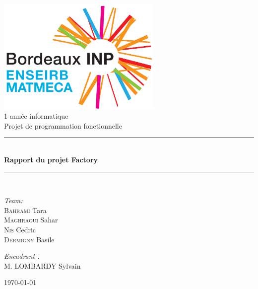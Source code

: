 \begin{titlepage}
\begin{center}
\includegraphics[width=0.6\textwidth]{logo.png}\\[1cm]
{\large 1 année informatique}\\[1cm]
{\large Projet de programmation fonctionnelle}\\[1cm]
\rule{\linewidth}{0.5mm} \\[0.4cm]
{ \huge \bfseries Rapport du projet Factory  \\[0.4cm] }
\rule{\linewidth}{0.5mm} \\[1.5cm]
\noindent
\begin{minipage}{0.4\textwidth}
  \begin{flushleft} \large
    \emph{Team:}\\
    \textsc{Bahrami} Tara  \\
    \textsc{Maghraoui} Sahar\\
    \textsc {Nis} Cedric \\
    \textsc {Dermigny} Basile \\
  \end{flushleft}
\end{minipage}%
\begin{minipage}{0.4\textwidth}
  \begin{flushright} \large
    \emph{Encadrant :} \\
    M. \textsc{LOMBARDY} {Sylvain} \\
    \textsc{}
  \end{flushright}
\end{minipage}
\vfill
{\large  \today}
\end{center}
\end{titlepage}